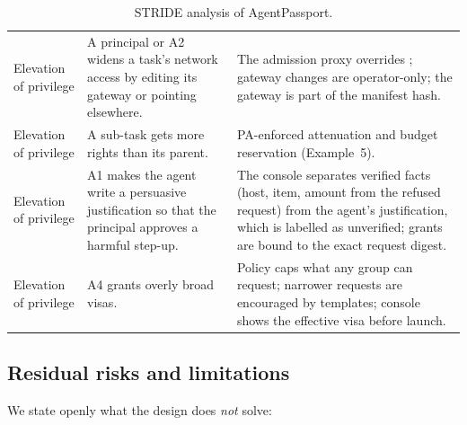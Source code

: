 \begin{table}[H]
\begin{tabularx}{\linewidth}{@{}L{2.1cm}L{4.4cm}Y@{}}
Elevation of privilege & A principal or A2 widens a task's network access by editing its gateway or pointing  elsewhere. & The admission proxy overrides ; gateway changes are operator-only; the gateway is part of the manifest hash.\\
Elevation of privilege & A sub-task gets more rights than its parent. & PA-enforced attenuation and budget reservation (Example~5).\\
Elevation of privilege & A1 makes the agent write a persuasive justification so that the principal approves a harmful step-up. & The console separates verified facts (host, item, amount from the refused request) from the agent's justification, which is labelled as unverified; grants are bound to the exact request digest.\\
Elevation of privilege & A4 grants overly broad visas. & Policy caps what any group can request; narrower requests are encouraged by templates; console shows the effective visa before launch.\\
\bottomrule
\end{tabularx}
\caption{STRIDE analysis of AgentPassport.}
\label{tab:stride}
\end{table}

\subsection{Residual risks and limitations}

We state openly what the design does \emph{not} solve:


